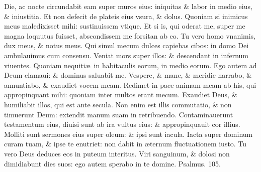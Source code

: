 \documentclass[a5paper,10pt]{book}
\def\ae{æ}
\begin{document}
\begin{multicols*}{2}
\newline \color{red} D\color{black}ie, ac nocte circundabit eam super muros eius: iniquitas \& labor in medio eius, \& iniustitia.
\newline \color{red} E\color{black}t non defecit de plateis eius vsura, \& dolus.
\newline \color{red} Q\color{black}uoniam si inimicus meus maledixisset mihi: sustinuissem vtique.
\newline \color{red} E\color{black}t si is, qui oderat me, super me magna loquutus fuisset, abscondissem me forsitan ab eo.
\newline \color{red} T\color{black}u vero homo vnanimis, dux meus, \& notus meus.
\newline \color{red} Q\color{black}ui simul mecum dulces capiebas cibos: in domo Dei ambulauimus cum consensu.
\newline \color{red} V\color{black}eniat mors super illos: \& descendant in infernum viuentes.
\newline \color{red} Q\color{black}uoniam nequiti\ae \ in habitaculis eorum, in medio eorum.
\newline \color{red} E\color{black}go autem ad Deum clamaui: \& dominus saluabit me.
\newline \color{red} V\color{black}espere, \& mane, \& meridie narrabo, \& annuntiabo, \& exaudiet vocem meam.
\newline \color{red} R\color{black}edimet in pace animam meam ab his, qui appropinquant mihi: quoniam inter multos erant mecum.
\newline \color{red} E\color{black}xaudiet Deus, \& humiliabit illos, qui est ante secula.
\newline \color{red} N\color{black}on enim est illis commutatio, \& non timuerunt Deum: extendit manum suam in retribuendo.
\newline \color{red} C\color{black}ontaminauerunt testamentum eius, diuisi sunt ab ira vultus eius: \& appropinquauit cor illius.
\newline \color{red} M\color{black}olliti sunt sermones eius super oleum: \& ipsi sunt iacula.
\newline \color{red} I\color{black}acta super dominum curam tuam, \& ipse te enutriet: non dabit in \ae ternum fluctuationem iusto.
\newline \color{red} T\color{black}u vero Deus deduces eos in puteum interitus.
\newline \color{red} V\color{black}iri sanguinum, \& dolosi non dimidiabunt dies suos: ego autem sperabo in te domine. \quad \color{red} Psalmus. \hypertarget{ps105}{105.} \color{black}

\end{multicols*}
\end{document}
